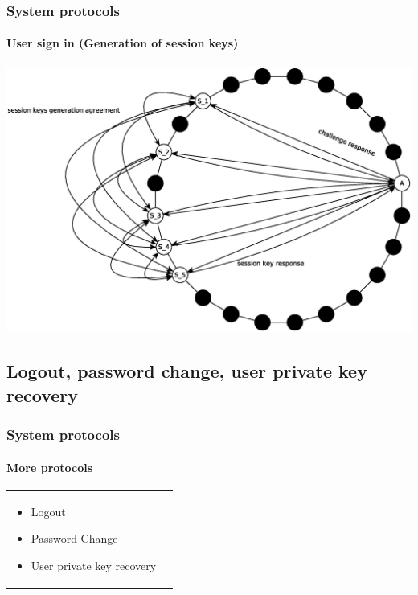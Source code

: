 \begin{frame}
\frametitle{System protocols}
\framesubtitle{User sign in (Generation of session keys)}
\includegraphics[height=0.7\textheight]{../../img/sign_in_3}\\
\end{frame}


\subsection{Logout, password change, user private key recovery}
\begin{frame}
\frametitle{System protocols}
\framesubtitle{More protocols}
\begin{table}
\begin{tabular}{p{7cm}p{3cm}}
\begin{itemize}
  \item Logout
  \item Password Change
  \item User private key recovery
\end{itemize}
&
\vspace{1.5cm}
\end{tabular}
\end{table}
\end{frame}

